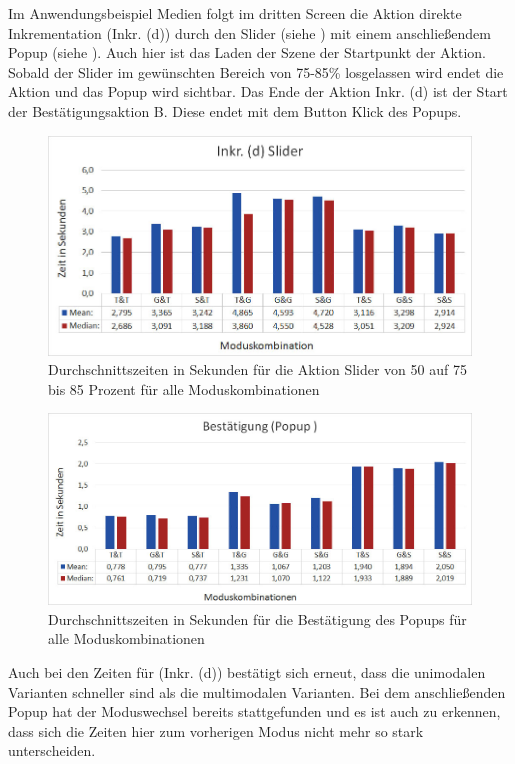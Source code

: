Im Anwendungsbeispiel Medien folgt im dritten Screen die Aktion direkte Inkrementation (Inkr. (d)) durch den Slider (siehe ) mit einem anschließendem Popup (siehe ). Auch hier ist das Laden der Szene der Startpunkt der Aktion. Sobald der Slider im gewünschten Bereich von 75-85\% losgelassen wird endet die Aktion und das Popup wird sichtbar. Das Ende der Aktion Inkr. (d) ist der Start der Bestätigungsaktion B. Diese endet mit dem Button Klick des Popups.
\begin{figure}[ht]
  \centering
  \includegraphics[width=1\textwidth]{img/Slider.JPG}
  \caption[Durchschnittszeiten für Inkr. (d)]{Durchschnittszeiten in Sekunden für die Aktion Slider von 50 auf 75 bis 85 Prozent für alle Moduskombinationen}
  \label{fig:Slider}
\end{figure} 
\begin{figure}[ht]
  \centering
  \includegraphics[width=1\textwidth]{img/PopupBestaetigung.JPG}
  \caption[Durchschnittszeiten für die Bestätigung des Popups]{Durchschnittszeiten in Sekunden für die Bestätigung des Popups für alle Moduskombinationen}
  \label{fig:Popup}
\end{figure} 
Auch bei den Zeiten für (Inkr. (d)) bestätigt sich erneut, dass die unimodalen Varianten schneller sind als die multimodalen Varianten. Bei dem anschließenden Popup hat der Moduswechsel bereits stattgefunden und es ist auch zu erkennen, dass sich die Zeiten hier zum vorherigen Modus nicht mehr so stark unterscheiden.

